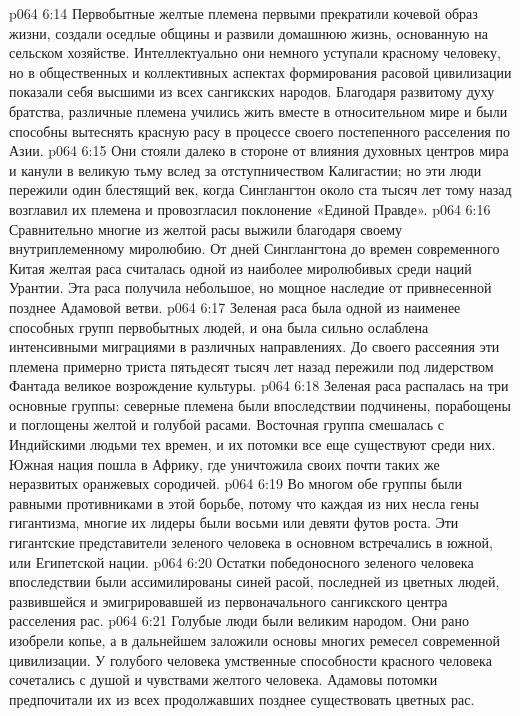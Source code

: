 \vs p064 6:14 \pc {}\bibnobreakspace {} Первобытные желтые племена первыми прекратили кочевой образ жизни, создали оседлые общины и развили домашнюю жизнь, основанную на сельском хозяйстве. Интеллектуально они немного уступали красному человеку, но в общественных и коллективных аспектах формирования расовой цивилизации показали себя высшими из всех сангикских народов. Благодаря развитому духу братства, различные племена учились жить вместе в относительном мире и были способны вытеснять красную расу в процессе своего постепенного расселения по Азии.
\vs p064 6:15 Они стояли далеко в стороне от влияния духовных центров мира и канули в великую тьму вслед за отступничеством Калигастии; но эти люди пережили один блестящий век, когда Синглангтон около ста тысяч лет тому назад возглавил их племена и провозгласил поклонение «Единой Правде».
\vs p064 6:16 Сравнительно многие из желтой расы выжили благодаря своему внутриплеменному миролюбию. От дней Синглангтона до времен современного Китая желтая раса считалась одной из наиболее миролюбивых среди наций Урантии. Эта раса получила небольшое, но мощное наследие от привнесенной позднее Адамовой ветви.
\vs p064 6:17 \pc {}\bibnobreakspace {} Зеленая раса была одной из наименее способных групп первобытных людей, и она была сильно ослаблена интенсивными миграциями в различных направлениях. До своего рассеяния эти племена примерно триста пятьдесят тысяч лет назад пережили под лидерством Фантада великое возрождение культуры.
\vs p064 6:18 Зеленая раса распалась на три основные группы: северные племена были впоследствии подчинены, порабощены и поглощены желтой и голубой расами. Восточная группа смешалась с Индийскими людьми тех времен, и их потомки все еще существуют среди них. Южная нация пошла в Африку, где уничтожила своих почти таких же неразвитых оранжевых сородичей.
\vs p064 6:19 Во многом обе группы были равными противниками в этой борьбе, потому что каждая из них несла гены гигантизма, многие их лидеры были восьми или девяти футов роста. Эти гигантские представители зеленого человека в основном встречались в южной, или Египетской нации.
\vs p064 6:20 Остатки победоносного зеленого человека впоследствии были ассимилированы синей расой, последней из цветных людей, развившейся и эмигрировавшей из первоначального сангикского центра расселения рас.
\vs p064 6:21 \pc {}\bibnobreakspace {} Голубые люди были великим народом. Они рано изобрели копье, а в дальнейшем заложили основы многих ремесел современной цивилизации. У голубого человека умственные способности красного человека сочетались с душой и чувствами желтого человека. Адамовы потомки предпочитали их из всех продолжавших позднее существовать цветных рас.
